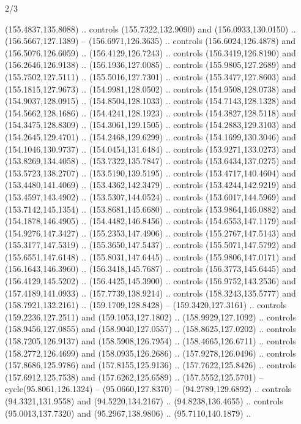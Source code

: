 \begin{flagdescription}{2/3}
\begin{scope}[shift={(0.5\flaglength,0.5)},scale=\flagwidth/320]
\begin{scope}[y=0.8pt, x=0.8pt, yscale=-1,shift={(-118.3,-146)}]
  (155.4837,135.8088) .. controls (155.7322,132.9090) and (156.0933,130.0150) ..
  (156.5667,127.1389) -- (156.6971,126.3635) .. controls (156.6024,126.4878) and
  (156.5076,126.6059) .. (156.4129,126.7243) .. controls (156.3419,126.8190) and
  (156.2646,126.9138) .. (156.1936,127.0085) .. controls (155.9805,127.2689) and
  (155.7502,127.5111) .. (155.5016,127.7301) .. controls (155.3477,127.8603) and
  (155.1815,127.9673) .. (154.9981,128.0502) .. controls (154.9508,128.0738) and
  (154.9037,128.0915) .. (154.8504,128.1033) .. controls (154.7143,128.1328) and
  (154.5662,128.1686) .. (154.4241,128.1923) .. controls (154.3827,128.5118) and
  (154.3475,128.8309) .. (154.3061,129.1505) .. controls (154.2883,129.3103) and
  (154.2645,129.4701) .. (154.2468,129.6299) .. controls (154.1699,130.3046) and
  (154.1046,130.9737) .. (154.0454,131.6484) .. controls (153.9271,133.0273) and
  (153.8269,134.4058) .. (153.7322,135.7847) .. controls (153.6434,137.0275) and
  (153.5723,138.2707) .. (153.5190,139.5195) .. controls (153.4717,140.4604) and
  (153.4480,141.4069) .. (153.4362,142.3479) .. controls (153.4244,142.9219) and
  (153.4597,143.4902) .. (153.5307,144.0524) .. controls (153.6017,144.5969) and
  (153.7142,145.1354) .. (153.8681,145.6680) .. controls (153.9864,146.0882) and
  (154.1878,146.4905) .. (154.4482,146.8456) .. controls (154.6553,147.1179) and
  (154.9276,147.3427) .. (155.2353,147.4906) .. controls (155.2767,147.5143) and
  (155.3177,147.5319) .. (155.3650,147.5437) .. controls (155.5071,147.5792) and
  (155.6551,147.6148) .. (155.8031,147.6445) .. controls (155.9806,147.0171) and
  (156.1643,146.3960) .. (156.3418,145.7687) .. controls (156.3773,145.6445) and
  (156.4129,145.5202) .. (156.4425,145.3900) .. controls (156.9752,143.2536) and
  (157.4189,141.0933) .. (157.7739,138.9214) .. controls (158.3243,135.5777) and
  (158.7921,132.2161) .. (159.1709,128.8428) -- (159.3420,127.3161) .. controls
  (159.2236,127.2511) and (159.1053,127.1802) .. (158.9929,127.1092) .. controls
  (158.9456,127.0855) and (158.9040,127.0557) .. (158.8625,127.0202) .. controls
  (158.7205,126.9137) and (158.5908,126.7954) .. (158.4665,126.6711) .. controls
  (158.2772,126.4699) and (158.0935,126.2686) .. (157.9278,126.0496) .. controls
  (157.8686,125.9786) and (157.8155,125.9136) .. (157.7622,125.8426) .. controls
  (157.6912,125.7538) and (157.6262,125.6589) .. (157.5552,125.5701) --
  cycle(95.8061,126.1324) -- (95.0660,127.8370) -- (94.2789,129.6892) ..
  controls (94.3321,131.9558) and (94.5220,134.2167) .. (94.8238,136.4655) ..
  controls (95.0013,137.7320) and (95.2967,138.9806) .. (95.7110,140.1879) ..

\end{scope}
\end{scope}
\end{flagdescription}
